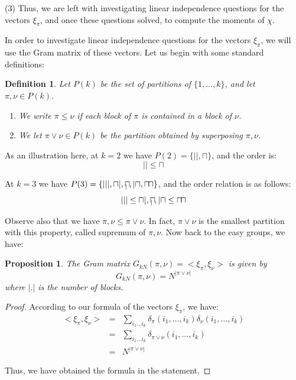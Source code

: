 \documentclass[12pt]{amsbook}
\newtheorem{definition}[theorem]{Definition}
\newtheorem{proposition}[theorem]{Proposition}
\begin{document}
(3) Thus, we are left with investigating linear independence questions for the vectors $\xi_\pi$, and once these questions solved, to compute the moments of $\chi$.

\bigskip

In order to investigate linear independence questions for the vectors $\xi_\pi$, we will use the Gram matrix of these vectors. Let us begin with some standard definitions:


\begin{definition}
Let $P(k)$ be the set of partitions of $\{1,\ldots,k\}$, and let $\pi,\nu\in P(k)$.
\begin{enumerate}
\item We write $\pi\leq\nu$ if each block of $\pi$ is contained in a block of $\nu$.

\item We let $\pi\vee\nu\in P(k)$ be the partition obtained by superposing $\pi,\nu$.
\end{enumerate}
\end{definition}

As an illustration here, at $k=2$ we have $P(2)=\{||,\sqcap\}$, and the order is:
$$||\leq\sqcap$$

At $k=3$ we have $P(3)=\{|||,\sqcap|,\sqcap\hskip-3.2mm{\ }_|\,,|\sqcap,\sqcap\hskip-0.7mm\sqcap\}$, and the order relation is as follows:
$$|||\leq\sqcap|,\sqcap\hskip-3.2mm{\ }_|\,,|\sqcap\leq\sqcap\hskip-0.7mm\sqcap$$

Observe also that we have $\pi,\nu\leq\pi\vee\nu$. In fact, $\pi\vee\nu$ is the smallest partition with this property, called supremum of $\pi,\nu$. Now back to the easy groups, we have:


\begin{proposition}
The Gram matrix $G_{kN}(\pi,\nu)=<\xi_\pi,\xi_\nu>$ is given by
$$G_{kN}(\pi,\nu)=N^{|\pi\vee\nu|}$$
where $|.|$ is the number of blocks.
\end{proposition}

\begin{proof}
According to our formula of the vectors $\xi_\pi$, we have:
\begin{eqnarray*}
<\xi_\pi,\xi_\nu>
&=&\sum_{i_1\ldots i_k}\delta_\pi(i_1,\ldots,i_k)\delta_\nu(i_1,\ldots,i_k)\\
&=&\sum_{i_1\ldots i_k}\delta_{\pi\vee\nu}(i_1,\ldots,i_k)\\
&=&N^{|\pi\vee\nu|}
\end{eqnarray*}

Thus, we have obtained the formula in the statement.
\end{proof}
\end{document}

